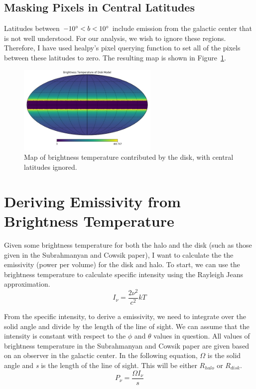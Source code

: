 \documentclass[letterpaper, 10pt]{article}
\begin{document}
 
\subsection{Masking Pixels in Central Latitudes}

Latitudes between $ -10\degree < b < 10\degree$ include emission from the galactic center that is not well understood. For our analysis, we wish to ignore these regions. Therefore, I have used healpy's pixel querying function to set all of the pixels between these latitudes to zero. The resulting map is shown in Figure~\ref{disk_mod}.

\begin{figure}[h]
\begin{center}
\includegraphics[width=0.6\textwidth]{disk_mod.jpg}
\caption{Map of brightness temperature contributed by the disk, with central latitudes ignored.}
\label{disk_mod}
\end{center}
\end{figure}


\section{Deriving Emissivity from Brightness Temperature}
Given some brightness temperature for both the halo and the disk (such as those given in the Subrahmanyan and Cowsik paper), I want to calculate the the emissivity (power per volume) for the disk and halo. To start, we can use the brightness temperature to calculate specific intensity using the Rayleigh Jeans approximation. 
\[ I_{\nu} = \frac{2\nu^{2}}{c^{2}}kT \]

From the specific intensity, to derive a emissivity, we need to integrate over the solid angle and divide by the length of the line of sight. We can assume that the intensity is constant with respect to the $\phi$ and $\theta$ values in question. All values of brightness temperature in the Subrahmanyan and Cowsik paper are given based on an observer in the galactic center. In the following equation, $\Omega$ is the solid angle and \emph{s} is the length of the line of sight. This will be either $R_{halo}$ or $R_{disk}$.
\[ P_{\nu} = \frac{\Omega I_{\nu}}{s} \]
\end{document}
